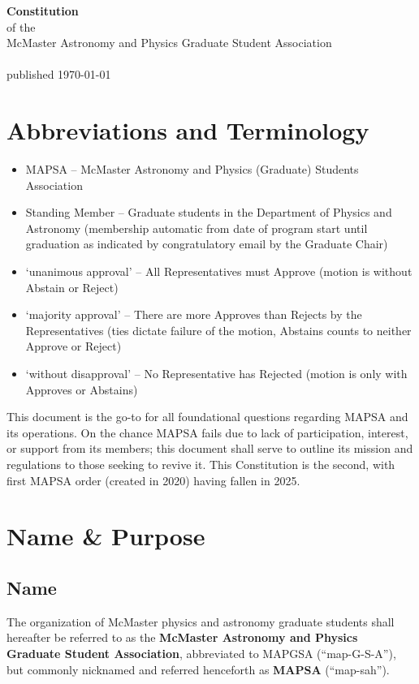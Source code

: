 \documentclass[8pt]{article}
\begin{document}
	
	\begin{center}
		\textbf{\Huge{Constitution}}\\\normalsize{of the}\\McMaster Astronomy and Physics Graduate Student Association\\~\\
		published \today
	\end{center}
	\tableofcontents	
	\section*{Abbreviations and Terminology}
	\begin{itemize}
		\item MAPSA -- McMaster Astronomy and Physics (Graduate) Students Association
		\item Standing Member -- Graduate students in the Department of Physics and Astronomy (membership automatic from date of program start until graduation as indicated by congratulatory email by the Graduate Chair) 
		\item `unanimous approval' -- All Representatives must Approve (motion is without Abstain or Reject)
		\item `majority approval' -- There are more Approves than Rejects by the Representatives (ties dictate failure of the motion, Abstains counts to neither Approve or Reject)
		\item `without disapproval' -- No Representative has Rejected (motion is only with Approves or Abstains)
	\end{itemize}
	\pagebreak
	This document is the go-to for all foundational questions regarding MAPSA and its operations. On the chance MAPSA fails due to lack of participation, interest, or support from its members; this document shall serve to outline its mission and regulations to those seeking to revive it. This Constitution is the second, with first MAPSA order (created in 2020) having fallen in 2025.
	\section{Name \& Purpose}
	\subsection{Name}
	The organization of McMaster physics and astronomy graduate students shall hereafter be referred to as the \textbf{McMaster Astronomy and Physics Graduate Student Association}, abbreviated to MAPGSA (``map-G-S-A''), but commonly nicknamed and referred henceforth as \textbf{MAPSA} (``map-sah'').
\end{document}
